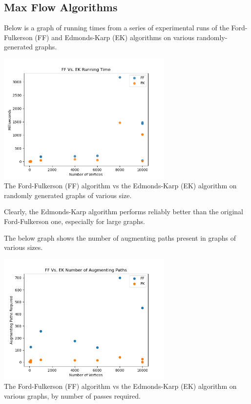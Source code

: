 \documentclass[12pt]{amsart}
\begin{document}
\subsection{Max Flow Algorithms}
    Below is a graph of running times from a series of
    experimental runs of the Ford-Fulkerson (FF) and
    Edmonds-Karp (EK) algorithms on various randomly-generated
    graphs.

\begin{center}
    \includegraphics[width=0.65\textwidth]
        {mf_algorithm_comparison} \\
    The Ford-Fulkerson (FF) algorithm vs the Edmonds-Karp (EK)
    algorithm on randomly generated graphs of various size. \\
    \vskip 1cm
\end{center}

    Clearly, the Edmonds-Karp algorithm performs reliably
    better than the original Ford-Fulkerson one, especially for
    large graphs.

    The below graph shows the number of augmenting paths present
    in graphs of various sizes.

\begin{center}
    \includegraphics[width=0.65\textwidth]
        {mf_passes_comparison.png} \\
    The Ford-Fulkerson (FF) algorithm vs the Edmonds-Karp (EK)
    algorithm on various graphs, by number of passes required.
    \\
    \vskip 1cm
\end{center}
\end{document}
